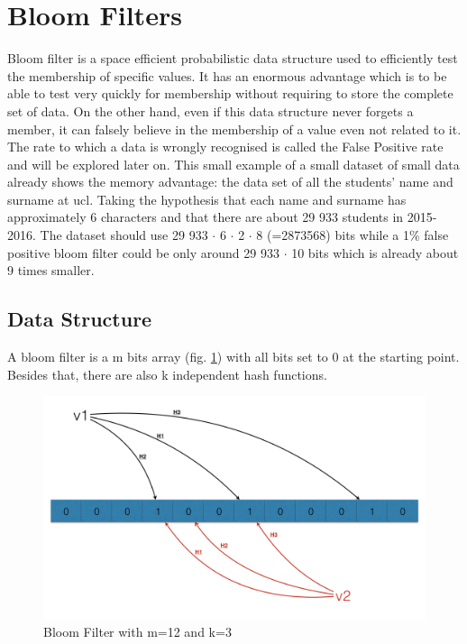 \documentclass{eplmastersthesis}
\begin{document}
\section{Bloom Filters}
Bloom filter \cite{bloom1970space} is a space efficient probabilistic data structure  used to efficiently test the membership of specific values.
It has an enormous advantage which is to be able to test very quickly for membership without requiring to store the complete set of data. On the other hand, even if this data structure never forgets a member, it can falsely believe in the membership of a value even not related to it. The rate to which a data is wrongly recognised is called the False Positive rate and will be explored later on.
This small example of a small dataset of small data already shows the memory advantage: the data set of all the students' name and surname at \gls{ucl}. Taking the hypothesis that each name and surname has approximately 6 characters and that there are about 29 933 students in 2015-2016. The dataset should use 29 933 $\cdot$ 6 $\cdot$ 2 $\cdot$ 8 (=2873568) bits while a 1\% false positive bloom filter could be only around 29 933 $\cdot$ 10 bits which is already about 9 times smaller.\\

\subsection{Data Structure}
A bloom filter is a m bits array (fig. \ref{bloom-1}) with all bits set to 0 at the starting point. Besides that, there are also k independent hash functions. 

\begin{figure}[h!]
	\begin{center}
		\includegraphics[scale=0.3]{res/bloom-1}
		\caption{Bloom Filter with m=12 and k=3}
		\label{bloom-1}
	\end{center}
\end{figure}
\end{document}
